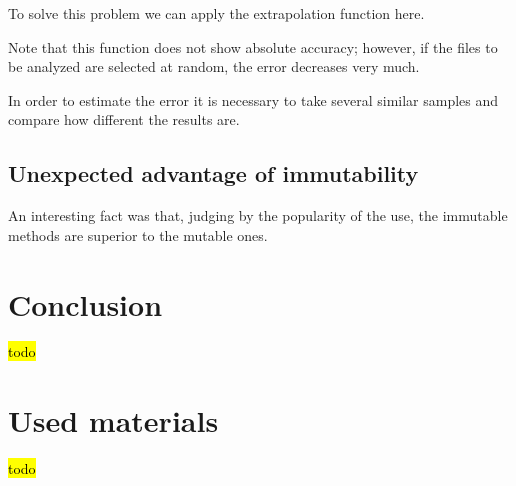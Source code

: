 \documentclass[anonymous,sigplan,review,11pt,nonacm,natbib=false]{acmart}
\begin{document}
    To solve this problem we can apply the extrapolation function here.

    Note that this function does not show absolute accuracy; however, if the files to be analyzed are selected at random, the error decreases very much.

    In order to estimate the error it is necessary to take several similar samples and compare how different the results are.

    \subsection{Unexpected advantage of immutability}

    An interesting fact was that, judging by the popularity of the use, the immutable methods are superior to the mutable ones.

    \section{Conclusion}\label{sec:conclusion}

    \hl{todo}

    \section{Used materials}

    \hl{todo}

    \printbibliography
\end{document}
